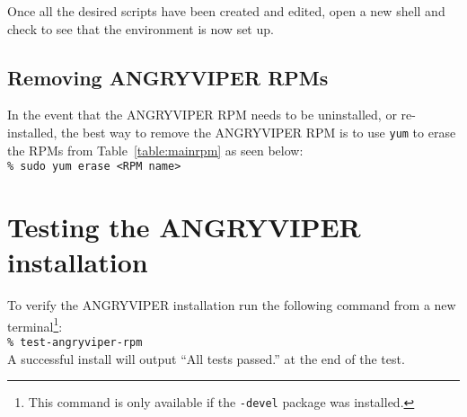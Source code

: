 Once all the desired scripts have been created and edited, open a new shell and check to see that the environment is now set up.

\subsection{Removing ANGRYVIPER RPMs}
In the event that the ANGRYVIPER RPM needs to be uninstalled, or re-installed, the best way to remove the ANGRYVIPER RPM is to use \verb+yum+ to erase the RPMs from Table~\ref{table:mainrpm} as seen below:\\

	\verb+% sudo yum erase <RPM name>+

\section{Testing the ANGRYVIPER installation}
\label{sec:testing_av}
To verify the ANGRYVIPER installation run the following command from a new terminal\footnote{This command is only available if the \texttt{-devel} package was installed.}:\\

\verb+% test-angryviper-rpm+\\

A successful install will output ``All tests passed.'' at the end of the test.

